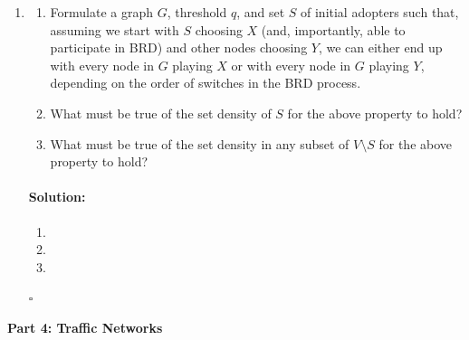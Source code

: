 \documentclass[11pt,letterpaper]{article}
\newif \iftemplate \templatetrue
\newenvironment{solution}{\paragraph{Solution:}}{\hfill$\square$}
\theoremstyle{definition}
\begin{document}
\begin{enumerate}
\item 
\begin{enumerate}
\item Formulate a graph $G$, threshold $q$, and set $S$ of initial adopters such that, assuming we start with $S$ choosing $X$ (and, importantly, able to participate in BRD) and other nodes choosing $Y$, we can either end up with every node in $G$ playing $X$ or with every node in $G$ playing $Y$, depending on the order of switches in the BRD process.
\item What must be true of the set density of $S$ for the above property to hold?
\item What must be true of the set density in any subset of $V \setminus S$ for the above property to hold?
\end{enumerate}
\iftemplate
\begin{solution}
\begin{enumerate}[label=(\alph*)]
\item 
\item 
\item
\end{enumerate}
\end{solution}
\newpage
\fi
\end{enumerate}


\noindent
{\Large\textbf{Part 4: Traffic Networks}\par}
\end{document}
